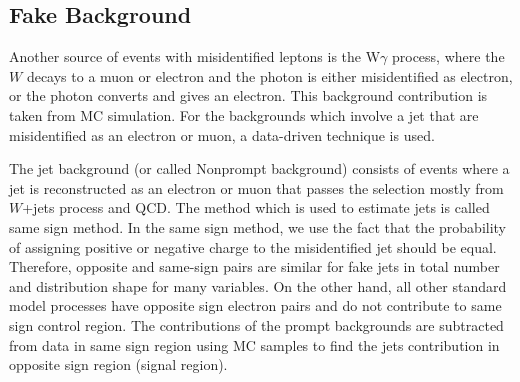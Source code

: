 \subsection{Fake Background}
\label{tW_fake_background}

Another source of events with misidentified leptons is the W$\gamma$ process,
where the $W$ decays to a muon or electron and the photon is either misidentified as electron, or the photon converts and gives an electron. This background contribution is taken from MC simulation. For the backgrounds which involve a jet that are misidentified as an electron or muon, a data-driven technique is used.

The jet background (or called Nonprompt background) consists of events where a jet is reconstructed as an electron or muon that
passes the selection mostly from $W$+jets process and QCD.
The method which is used to estimate jets  is called same sign
method. In the same sign method, we use the fact that the probability of assigning positive or
negative charge to the misidentified jet should be equal. Therefore, opposite and same-sign  pairs are similar for fake jets in total number and distribution shape for many variables.
On the other hand, all other standard model processes have opposite sign electron pairs and
do not contribute to same sign control region. The contributions of the prompt backgrounds
are subtracted from data in same sign region using MC samples  to find the jets contribution in opposite sign region (signal region).

